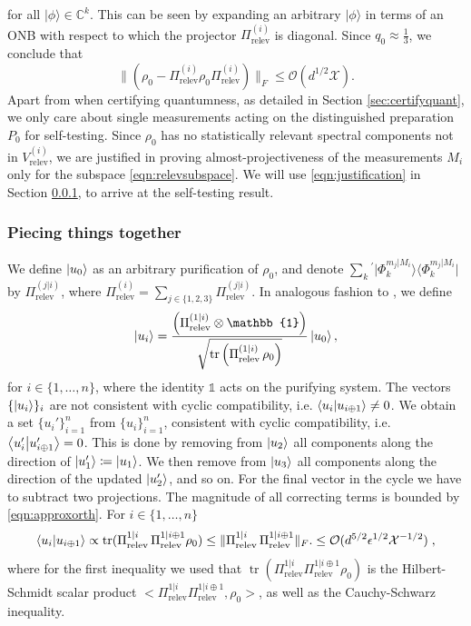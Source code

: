 for all $\vert \phi\rangle\in\mathbb{C}^k$. This can be seen by expanding an arbitrary $\vert \phi \rangle $ in terms of an ONB with respect to which the projector $\Pi_{\text{relev}}^{(i)}$ is diagonal.
Since $q_0\approx\frac{1}{3}$, we conclude that
\begin{equation}
\label{eqn:justification}
\|(\rho_{0}-\Pi_{\text{relev}}^{(i)}\rho_{0}\Pi_{\text{relev}}^{(i)})\|_F \leq \mathcal{O}(d^{1/2}\mathcal{X}).
\end{equation}
Apart from when certifying quantumness, as detailed in Section \ref{sec:certifyquant}, we only care about single measurements acting on the distinguished preparation $P_0$ for self-testing. Since $\rho_0$ has no statistically relevant spectral components not in $V_{\text{relev}}^{(i)}$, we are justified in proving almost-projectiveness of the measurements $M_i$ only for the subspace \ref{eqn:relevsubspace}. We will use \ref{eqn:justification} in Section \ref{sec:piecing}, to arrive at the self-testing result.
\subsubsection{Piecing things together}
\label{sec:piecing}
We define $\ket{u_0}$ as an arbitrary purification of $\rho_0$, and denote $\sum_k{}^{'}\vert \Phi_k^{m_j\vert M_i}\rangle \langle \Phi_k^{m_j\vert M_i}\vert$ by $\Pi_{\text{relev}}^{(j\vert i)}$, where $\Pi_{\text{relev}}^{(i)}=\sum_{j\in\{1,2,3\}}\Pi_{\text{relev}}^{(j\vert i)}$. In analogous fashion to \cite{Bharti2019}, we define
\begin{equation*}
\ket{u_i} = \frac{\left(\Pi_{\text{relev}}^{(1\vert i)}\otimes\mathbb{1}\right)}{\sqrt{\operatorname{tr}\left(\Pi_{\text{relev}}^{(1\vert i)}\thinspace\rho_0\right)}}\ket{u_0},
\end{equation*}
for $i\in\{1,\dots,n\}$, where the identity $\mathbb{1}$ acts on the purifying system. The vectors $\{\ket{u_i}\}_i$ are not consistent with cyclic compatibility, i.e. $\bra{u_i}\ket{u_{i\oplus 1}}\neq 0$.
We obtain a set $\{u_i'\}_{i=1}^n$ from $\{u_i\}_{i=1}^n$, consistent with cyclic compatibility, i.e. $\bra{u_i'}\ket{u_{i\oplus 1}'}=0$. This is done by removing from $\ket{u_2}$ all components along the direction of $\ket{u_1'}\coloneqq\ket{u_1}$. We then remove from $\ket{u_3}$ all components along the direction of the updated $\ket{u_2'}$, and so on. For the final vector in the cycle we have to subtract two projections. The magnitude of all correcting terms is bounded by \ref{eqn:approxorth}.
For $i\in\{1,\dots,n\}$
\begin{equation*}
\bra{u_i}\ket{u_{i\oplus 1}}\propto\operatorname{tr}(\Pi_{\text{relev}}^{1\vert i}\thinspace\Pi_{\text{relev}}^{1\vert i\oplus 1}\rho_0) \leq \|\Pi_{\text{relev}}^{1\vert i}\thinspace\Pi_{\text{relev}}^{1\vert i\oplus 1}\|_F. \leq \mathcal{O}(d^{5/2}\epsilon^{1/2}\mathcal{X}^{-1/2})\; ,
\end{equation*}
where for the first inequality we used that $\operatorname{tr}(\Pi_{\text{relev}}^{1\vert i}\Pi_{\text{relev}}^{1\vert i\oplus 1}\rho_0)$ is the Hilbert-Schmidt scalar product $<\Pi_{\text{relev}}^{1\vert i}\Pi_{\text{relev}}^{1\vert i\oplus 1},\rho_0>$, as well as the Cauchy-Schwarz inequality.

